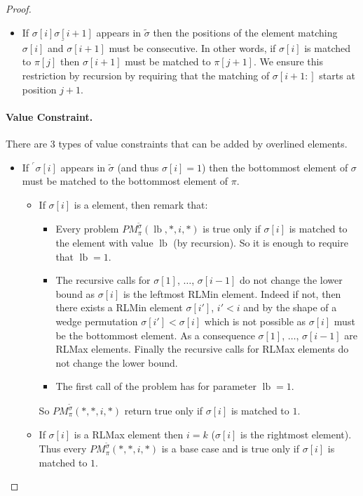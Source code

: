 \documentclass[a4paper]{llncs}
\newcommand{\RLMin}{\text{RLMin}}
\newcommand{\ptext}{\pi}
\newcommand{\ppattern}{\sigma}
\newcommand{\PM}{PM}
\DeclareMathOperator{\lb}{lb}
\begin{document}
\begin{proof}
\begin{itemize}
	\item If $\underline{\ppattern[i]\ppattern[i+1]}$ appears in $\widetilde{\sigma}$ then the positions of the element matching $\ppattern[i]$ and $\ppattern[i+1]$ must be consecutive. In other words, if $\ppattern[i]$ is matched to $\ptext[j]$ then $\ppattern[i+1]$ must be matched to $\ptext[j+1]$. We ensure this restriction by recursion by requiring that the matching of $\ppattern[i+1:]$ starts at position $j+1$.
\end{itemize}

\paragraph{Value Constraint.} There are 3 types of value constraints that can be added by overlined elements.
\begin{itemize}
	\item If $^\ulcorner{\sigma[i]}$ appears in $\widetilde{\sigma}$ (and thus $\sigma[i]=1$) then the bottommost element of $\ppattern$ must be matched to the bottommost element of $\ptext$.
	\begin{itemize}

		\item If $\sigma[i]$ is a \RLMin element, then remark that:
		\begin{itemize}
			\item Every problem 
			$\PM^{\widetilde{\sigma}}_{\ptext}(\lb,*,i,*)$ is true only if $\sigma[i]$ is matched to the element with value $\lb$ (by recursion).
			So it is enough to require that $\lb=1$.
			\item The recursive calls for $\sigma[1]$, $\ldots$, $\sigma[i-1]$
			do not change the lower bound as
			$\sigma[i]$ is the leftmost RLMin element. Indeed if not, then there exists a RLMin element $\sigma[i']$, $i'<i$ and by the shape of a wedge permutation $\sigma[i']<\sigma[i]$ which is not possible as $\sigma[i]$ must be the bottommost element. 
			As a consequence $\sigma[1]$, $\ldots$, $\sigma[i-1]$ are RLMax elements. Finally the recursive calls for RLMax elements do not change the lower bound.
			\item The first call of the problem has for parameter $\lb=1$. 
		\end{itemize} 
		So $\PM^{\widetilde{\sigma}}_{\ptext}(*,*,i,*)$ return true only if 
		$\sigma[i]$ is matched to $1$.
		 		
		\item If $\sigma[i]$ is a RLMax element then $i=k$ ($\sigma[i]$ is the rightmost element). Thus every $\PM^{\widetilde{\sigma}}_{\ptext}(*,*,i,*)$ is a base case and is true only if $\sigma[i]$ is matched to $1$.


\end{itemize}
\end{itemize}
\end{proof}
\end{document}
